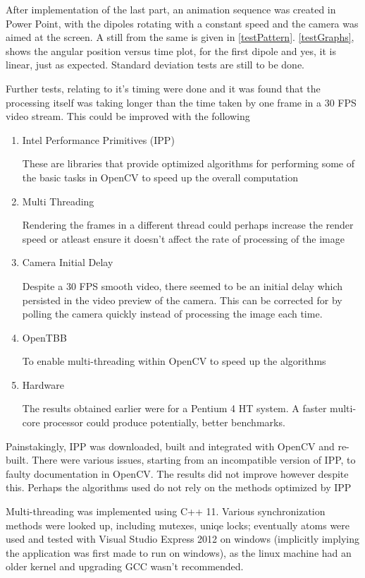 		After implementation of the last part, an animation sequence was created in Power Point, with the dipoles rotating with a constant speed and the camera was aimed at the screen. A still from the same is given in \autoref{testPattern}. \autoref{testGraphs}, shows the angular position versus time plot, for the first dipole and yes, it is linear, just as expected. Standard deviation tests are still to be done.
		\par
		Further tests, relating to it's timing were done and it was found that the processing itself was taking longer than the time taken by one frame in a 30 FPS video stream. This could be improved with the following
		\begin{enumerate}
			\item Intel Performance Primitives (IPP)
				\par
				These are libraries that provide optimized algorithms for performing some of the basic tasks in OpenCV to speed up the overall computation
			\item Multi Threading
				\par
				Rendering the frames in a different thread could perhaps increase the render speed or atleast ensure it doesn't affect the rate of processing of the image
			\item Camera Initial Delay
				\par
				Despite a 30 FPS smooth video, there seemed to be an initial delay which persisted in the video preview of the camera. This can be corrected for by polling the camera quickly instead of processing the image each time.
			\item OpenTBB
				\par
				To enable multi-threading within OpenCV to speed up the algorithms
			\item Hardware
				\par
				The results obtained earlier were for a Pentium 4 HT system. A faster multi-core processor could produce potentially, better benchmarks.
		\end{enumerate}
		Painstakingly, IPP was downloaded, built and integrated with OpenCV and re-built. There were various issues, starting from an incompatible version of IPP, to faulty documentation in OpenCV. The results did not improve however despite this. Perhaps the algorithms used do not rely on the methods optimized by IPP
		\par
		Multi-threading was implemented using C++ 11. Various synchronization methods were looked up, including mutexes, uniqe locks; eventually atoms were used and tested with Visual Studio Express 2012 on windows (implicitly implying the application was first made to run on windows), as the linux machine had an older kernel and upgrading GCC wasn't recommended.
